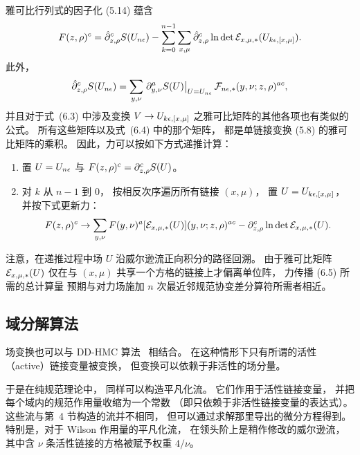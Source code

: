 雅可比行列式的因子化 (5.14) 蕴含
\begin{equation}
   F(z,\rho)^c=\hat{\partial}^c_{z,\rho}S(U_{n\epsilon})
   -\sum_{k=0}^{n-1}\sum_{x,\mu}
  \hat{\partial}^c_{z,\rho}\ln\det\mathcal{E}_{x,\mu,*}(U_{k\epsilon,[x,\mu]}).
\end{equation}
此外，
\begin{equation}
  \hat{\partial}^c_{z,\rho}S(U_{n\epsilon})=
  \sum_{y,\nu}\left.\partial^a_{y,\nu}S(U)\right|_{U=U_{n\epsilon}}
  \mathcal{F}_{n\epsilon,*}(y,\nu;z,\rho)^{ac},
\end{equation}
并且对于式~(6.3) 中涉及变换 $V\to U_{k\epsilon,[x,\mu]}$
之雅可比矩阵的其他各项也有类似的公式。
所有这些矩阵以及式~(6.4) 中的那个矩阵，
都是单链接变换 (5.8) 的雅可比矩阵的乘积。
因此，力可以按如下方式递推计算：

\begin{enumerate}[leftmargin=2.2em,itemsep=0.6ex]
\item 置 $U=U_{n\epsilon}$ 与 $F(z,\rho)^c=\partial^c_{z,\rho}S(U)$。

\item 对 $k$ 从 $n-1$ 到 $0$，
按相反次序遍历所有链接 $(x,\mu)$，
置 $U=U_{k\epsilon,[x,\mu]}$，
并按下式更新力：
\begin{equation}
   F(z,\rho)^c\to\sum_{y,\nu}F(y,\nu)^a
   [\mathcal{E}_{x,\mu,*}(U)](y,\nu;z,\rho)^{ac}
   -\partial^c_{z,\rho}\ln\det\mathcal{E}_{x,\mu,*}(U).
\end{equation}
\end{enumerate}

\noindent
注意，在递推过程中场 $U$ 沿威尔逊流正向积分的路径回溯。
由于雅可比矩阵 $\mathcal{E}_{x,\mu,*}(U)$ 仅在与 $(x,\mu)$ 共享一个方格的链接上才偏离单位阵，
力传播 (6.5) 所需的总计算量
预期与对力场施加 $n$ 次最近邻规范协变差分算符所需者相近。


\subsection{域分解算法}

场变换也可以与 DD-HMC 算法~\cite{DDHMC} 相结合。
在这种情形下只有所谓的活性（active）链接变量被变换，
但变换可以依赖于非活性的场分量。

于是在纯规范理论中，
同样可以构造平凡化流。
它们作用于活性链接变量，
并把每个域内的规范作用量收缩为一个常数
（即只依赖于非活性链接变量的表达式）。
这些流与第~4 节构造的流并不相同，
但可以通过求解那里导出的微分方程得到。
特别是，对于 Wilson 作用量的平凡化流，
在领头阶上是稍作修改的威尔逊流，
其中含 $\nu$ 条活性链接的方格被赋予权重 $4/\nu$。
